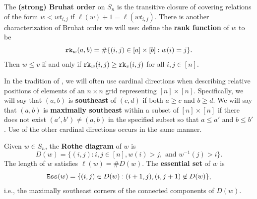 \documentclass[12pt,reqno]{amsart}
\newtheorem{Main Conjecture}[theorem]{Main Conjecture}
\theoremstyle{remark}
\theoremstyle{plain}
\newcommand{\mydef}[1]{{\bf #1}}
\newcommand{\ess}{{\tt Ess}}
\newcommand{\rk}{{\tt rk}}
\begin{document}
The \mydef{(strong) Bruhat order} on $S_n$ is the transitive closure of covering relations of the form $w<wt_{i,j}$ if $\ell(w)+1=\ell(wt_{i,j})$.    There is another characterization of Bruhat order we will use: define the \mydef{rank function} of $w$ to be \[\rk_w(a,b)=\#\{(i,j)\in [a]\times [b]: w(i)=j\}.\]  Then $w\leq v$ if and only if $\rk_w(i,j)\geq \rk_v(i,j)$ for all $i,j\in[n]$.

In the tradition of \cite{KM05}, we will often use cardinal directions when describing relative positions of elements of an $n \times n$ grid representing $[n] \times [n]$.  Specifically, we will say that $(a,b)$ is \mydef{southeast} of $(c,d)$ if both $a\geq c$ and $b\geq d$.  We will say that $(a,b)$ is \mydef{maximally southeast} within a subset of $[n] \times [n]$ if there does not exist $(a',b') \neq (a,b)$ in the specified subset so that $a \leq a'$ and $b \leq b'$.  Use of the other cardinal directions occurs in the same manner.

Given $w\in S_n$, the \mydef{Rothe diagram} of $w$ is \[D(w)=\{(i,j):i,j\in [n], w(i)>j, \text{ and } w^{-1}(j)>i\}.\]  The length of $w$ satisfies $\ell(w)=\#D(w)$. The \mydef{essential set} of $w$ is 
\[\ess(w)=\{(i,j)\in D(w):(i+1,j),(i,j+1)\not \in D(w)\},\] i.e., the maximally southeast corners of the connected components of $D(w)$. 
\end{document}
